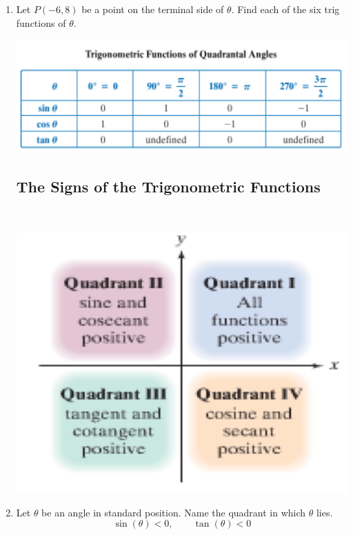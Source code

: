 \begin{enumerate}
\item Let $P(-6,8)$ be a point on the terminal side of $\theta$.  Find each of the six trig functions of $\theta$.\\[2in]

\begin{center}
\includegraphics[scale=.7]{quadrantal}
\end{center}

\subsection{The Signs of the Trigonometric Functions} ~

\begin{center}
\includegraphics[scale=.8]{signs}
\end{center}

\item Let $\theta$ be an angle in standard position.  Name the quadrant in which $\theta$ lies.
$$\sin(\theta)<0, \quad \quad \tan(\theta)<0$$



\end{enumerate}
